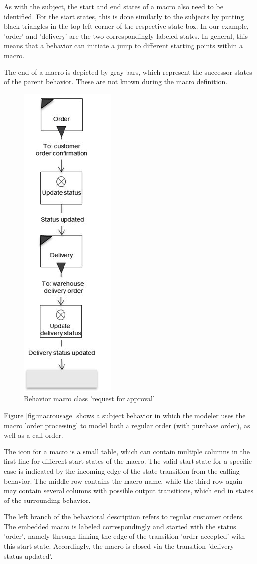 As with the subject, the start and end states of a macro also need to be identified. For the start states, this is done similarly to the subjects by putting black triangles in the top left corner of the respective state box. In our example, 'order' and 'delivery' are the two correspondingly labeled states. In general, this means that a behavior can initiate a jump to different starting points within a macro.

The end of a macro is depicted by gray bars, which represent the successor states of the parent behavior. These are not known during the macro definition.

\begin{figure}[htbp]
	\centering
	\includegraphics[width=0.2\linewidth]{Figures/Ontology/SubjectExecution/MacroBehavior}
	\caption[Behavior macro class 'request for approval']{Behavior macro class 'request for approval'}
	\label{fig:macrobehavior}
\end{figure}

Figure \ref{fig:macrousage} shows a subject behavior in which the modeler uses the macro 'order processing' to model both a regular order (with purchase order), as well as a call order.

The icon for a macro is a small table, which can contain multiple columns in the first line for different start states of the macro. The valid start state for a specific case is indicated by the incoming edge of the state transition from the calling behavior. The middle row contains the macro name, while the third row again may contain several columns with possible output transitions, which end in states of the surrounding behavior.

The left branch of the behavioral description refers to regular customer orders. The embedded macro is labeled correspondingly and started with the status 'order', namely through linking the edge of the transition 'order accepted' with this start state. Accordingly, the macro is closed via the transition 'delivery status updated'.

